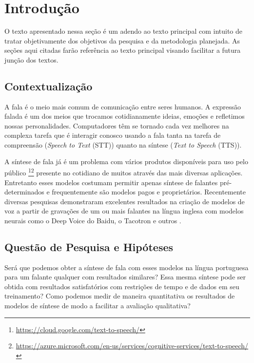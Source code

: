 \documentclass{article}
\begin{document}
\section{Introdução}
O texto apresentado nessa seção é um adendo ao texto principal com intuito de tratar objetivamente dos objetivos da pesquisa e da metodologia planejada. As seções aqui citadas farão referência ao texto principal visando facilitar a futura junção dos textos.
\subsection{Contextualização}
A fala é o meio mais comum de comunicação entre seres humanos\cite{flanang}. 
A expressão falada é um dos meios que trocamos cotidianamente ideias, emoções e refletimos nossas personalidades\cite{Tiwari2012}. 
Computadores têm se tornado cada vez melhores na complexa tarefa que é interagir conosco usando a fala \cite{HCI-voice} tanta na tarefa de compreensão (\emph{Speech to Text} (STT)) quanto na síntese (\emph{Text to Speech} (TTS)). 

A síntese de fala já é um problema com vários produtos disponíveis para uso pelo público \footnote{\url{https://cloud.google.com/text-to-speech/}}\footnote{\url{https://azure.microsoft.com/en-us/services/cognitive-services/text-to-speech/}} presente no cotidiano de muitos através das mais diversas aplicações.
Entretanto esses modelos costumam permitir apenas síntese de falantes pré-determinados e frequentemente são modelos pagos e proprietários. 
Recentemente diversas pesquisas demonstraram excelentes resultados na criação de modelos de voz a partir de gravações de um ou mais falantes na língua inglesa com modelos neurais como o Deep Voice\cite{deepVoice,deepVoice2,deepvoice3:DBLP:journals/corr/abs-1710-07654} do Baidu, o Tacotron \cite{tacotron,tacotron2:DBLP:journals/corr/abs-1712-05884} e outros \cite{baidu_voice_clonning:DBLP:journals/corr/abs-1802-06006,facebook:DBLP:journals/corr/TaigmanWPN17,speech_adaptation,wavenet}.

\subsection{Questão de Pesquisa e Hipóteses}
Será que podemos obter a síntese de fala com esses modelos na língua portuguesa para um falante qualquer com resultados similares?
Essa mesma síntese pode ser obtida com resultados satisfatórios com restrições de tempo e de dados em seu treinamento?
Como podemos medir de maneira quantitativa os resultados de modelos de síntese de modo a facilitar a avaliação qualitativa?
\end{document}
